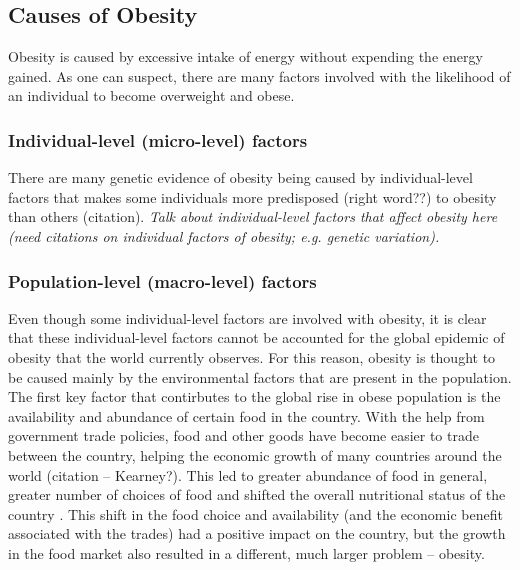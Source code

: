 \subsection{Causes of Obesity}
\label{sub:causes_of_obesity}

Obesity is caused by excessive intake of energy without expending the energy gained.
As one can suspect, there are many factors involved with the likelihood of an individual to become overweight and obese.

\subsubsection{Individual-level (micro-level) factors}
\label{ssub:Individual-level (micro-level) factors}

There are many genetic evidence of obesity being caused by individual-level factors that makes some individuals more predisposed (right word??) to obesity than others (citation).
\textit{Talk about individual-level factors that affect obesity here (need citations on individual factors of obesity; e.g. genetic variation).}

\subsubsection{Population-level (macro-level) factors}
\label{ssub:Population-level (macro-level) factors}

Even though some individual-level factors are involved with obesity, it is clear that these individual-level factors cannot be accounted for the global epidemic of obesity that the world currently observes.
For this reason, obesity is thought to be caused mainly by the environmental factors that are present in the population.\\

\noindent
The first key factor that contirbutes to the global rise in obese population is the availability and abundance of certain food in the country.
With the help from government trade policies, food and other goods have become easier to trade between the country, helping the economic growth of many countries around the world (citation -- Kearney?).
This led to greater abundance of food in general, greater number of choices of food and shifted the overall nutritional status of the country \citep{Malik2013}.
This shift in the food choice and availability (and the economic benefit associated with the trades) had a positive impact on the country, but the growth in the food market also resulted in a different, much larger problem -- obesity.

